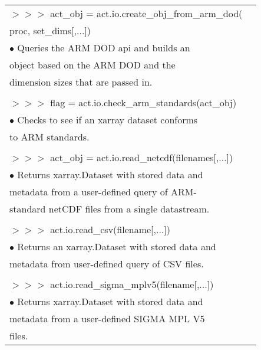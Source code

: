 \documentclass[potrait, z1paper, fontscale=0.33]{baposter} %
\begin{document}
\begin{poster}
{\begin{flushleft}
\begin{tabular}{@{}ll@{}}
$>$$>$$>$ act\_obj = act.io.create\_obj\_from\_arm\_dod(\\
\-\hspace{1.5cm} proc, set\_dims[,...])\\
\-\hspace{0.2cm} $\bullet$ Queries the ARM DOD api and builds an\\
\-\hspace{0.5cm} object based on the ARM DOD and the\\
\-\hspace{0.5cm} dimension sizes that are passed in.\\
\\
$>$$>$$>$ flag = act.io.check\_arm\_standards(act\_obj)\\
\-\hspace{0.2cm} $\bullet$ Checks to see if an xarray dataset conforms\\
\-\hspace{0.5cm} to ARM standards.\\
\\
$>$$>$$>$ act\_obj = act.io.read\_netcdf(filenames[,...])\\
\-\hspace{0.2cm} $\bullet$ Returns xarray.Dataset with stored data and\\
\-\hspace{0.5cm} metadata from a user-defined query of ARM-\\
\-\hspace{0.5cm} standard netCDF files from a single datastream.\\
\\
$>$$>$$>$ act.io.read\_csv(filename[,...])\\
\-\hspace{0.2cm} $\bullet$ Returns an xarray.Dataset with stored data and\\
\-\hspace{0.5cm} metadata from user-defined query of CSV files.\\
\\
$>$$>$$>$ act.io.read\_sigma\_mplv5(filename[,...])\\
\-\hspace{0.2cm} $\bullet$ Returns xarray.Dataset with stored data and\\
\-\hspace{0.5cm} metadata from a user-defined SIGMA MPL V5\\
\-\hspace{0.5cm} files.\\

\end{tabular}
\end{flushleft}}
\end{poster}
\end{document}
